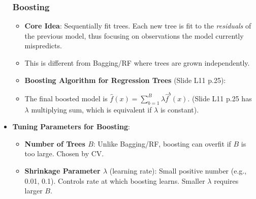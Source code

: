 \documentclass[12pt,a4paper]{article}
\begin{document}
\begin{itemize}
    \subsubsection{Boosting }
        \begin{itemize}
            \item \textbf{Core Idea}: Sequentially fit trees. Each new tree is fit to the \textit{residuals} of the previous model, thus focusing on observations the model currently mispredicts.
            \item This is different from Bagging/RF where trees are grown independently.
            \item \textbf{Boosting Algorithm for Regression Trees} (Slide L11 p.25):
                    \item The final boosted model is $\hat{f}(x) = \sum_{b=1}^B \lambda \hat{f}^b(x)$. (Slide L11 p.25 has $\lambda$ multiplying sum, which is equivalent if $\lambda$ is constant).
                \end{itemize}
            \item \textbf{Tuning Parameters for Boosting}:
                \begin{itemize}
                    \item \textbf{Number of Trees $B$}: Unlike Bagging/RF, boosting can overfit if $B$ is too large. Chosen by CV.
                    \item \textbf{Shrinkage Parameter $\lambda$} (learning rate): Small positive number (e.g., 0.01, 0.1). Controls rate at which boosting learns. Smaller $\lambda$ requires larger $B$.

\end{itemize}
\end{itemize}
\end{document}
